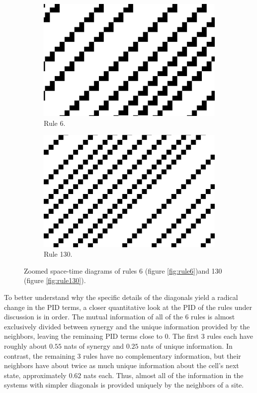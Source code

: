 \documentclass[12pt]{article}
\begin{document}
\begin{figure} [!h]
\begin{subfigure}{.5\textwidth}
  \centering
  \includegraphics[width=.9\linewidth]{rule6-zoomed}
  \caption{Rule 6.}
  \label{fig:rule6-zoomed}
\end{subfigure}%
\begin{subfigure}{.5\textwidth}
  \centering
  \includegraphics[width=.9\linewidth]{rule130-zoomed}
  \caption{Rule 130.}
  \label{fig:rule130-zoomed}
\end{subfigure}
\caption{Zoomed space-time diagrams of rules 6 (figure \ref{fig:rule6})and 130 (figure \ref{fig:rule130}).} 
\label{fig:eca-diagonals-zoomed}
\end{figure}

To better understand why the specific details of the diagonals yield a radical change in the PID terms, a closer quantitative look at the PID of the rules under discussion is in order. The mutual information of all of the 6 rules is almost exclusively divided between synergy and the unique information provided by the neighbors, leaving the reminaing PID terms close to 0. The first 3 rules each have roughly about $0.55$ nats of synergy and $0.25$ nats of unique information. In contrast, the remaining 3 rules have no complementary information, but their neighbors have about twice as much unique information about the cell's next state, approximately $0.62$ nats each. Thus, almost all of the information in the systems with simpler diagonals is provided uniquely by the neighbors of a site. 
\end{document}
